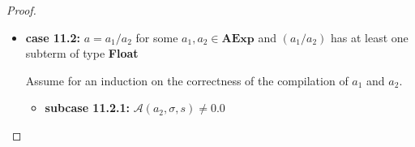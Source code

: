 \documentclass{article}
\begin{document}
\begin{proof}
\begin{itemize}
\begin{itemize}
            \[
              \begin{aligned}
                \langle  \mathcal{CA}(a) : c,\, e,\, \sigma,\, s,\, pc \rangle 
                &= \langle \mathcal{CA}(a_1 / a_2) : c,\, e,\, \sigma,\, s,\, pc \rangle \\
                &= \langle \mathcal{CA}(a_2) : \mathcal{CA}(a_1) : \texttt{iDIV} :  c,\, e,\, \sigma,\, s,\, pc \rangle 
                && \text{(definition of $\mathcal{CA}$)} \\
                &\triangleright^{\ast} \langle \mathcal{CA}(a_1) : \texttt{iDIV} :  c,\, \mathcal{A}(a_2, \sigma, s) : e,\, \sigma,\, s,\, pc + l_2 \rangle 
                && \text{(induction hypothesis 2)} \\
                &= \langle \mathcal{CA}(a_1) : \texttt{iDIV} :  c,\, 0 : e,\, \sigma,\, s,\, pc + l_2 \rangle \\
                &\triangleright^{\ast} \langle \texttt{iDIV} :  c,\, \mathcal{A}(a_1, \sigma, s) : 0 : e,\, \sigma,\, s,\, pc + l_2 + l_1 \rangle 
                && \text{(induction hypothesis 1)} \\
                &\triangleright \langle c,\, \bot : e,\, \hat{\sigma},\, s,\, pc + l_2 + l_1 + 1 \rangle 
                && \text{(operational semantics)} \\
                &= \langle c,\, \mathcal{A}(a_1 / a_2, \sigma, s) : e,\, \hat{\sigma},\, s,\, pc + l_2 + l_1 + 1 \rangle
                && \text{(definition of $\mathcal{A}$)} \\
                &= \langle c,\, \mathcal{A}(a, \sigma, s) : e,\, \hat{\sigma},\, s,\, pc + l_2 + l_1 + 1 \rangle \\
              \end{aligned}
          \]
            
        \end{itemize}

    \item \textbf{case 11.2: } $a = a_1 / a_2$ for some $a_1, a_2 \in \textbf{AExp}$ and $(a_1 / a_2)$ has at least one subterm of type \textbf{Float}

    Assume for an induction on the correctness of the compilation of $a_1$ and $a_2$.

        \begin{itemize}
            \item \textbf{subcase 11.2.1: } $\mathcal{A}(a_2, \sigma, s) \neq 0.0$


\end{itemize}
\end{itemize}
\end{proof}
\end{document}
